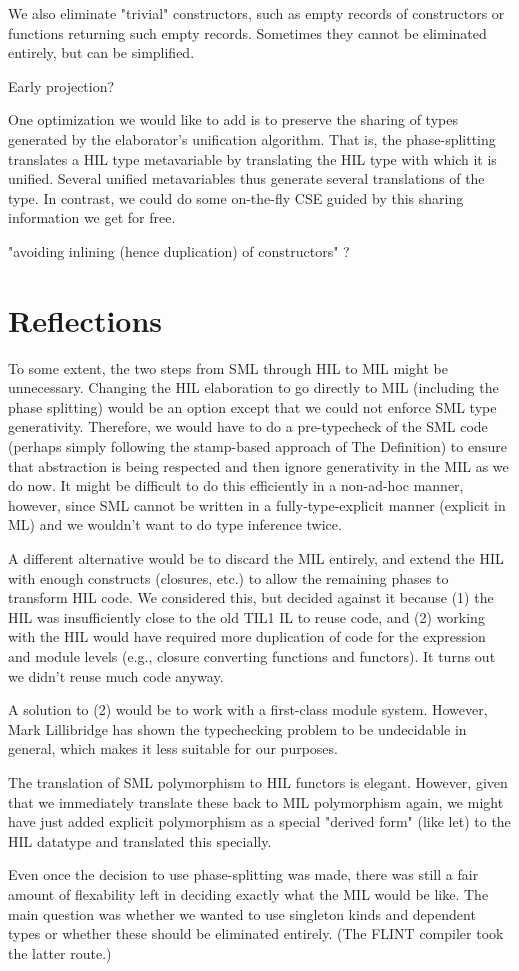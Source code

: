 \documentclass[12pt,twoside]{article}
\begin{document}
We also eliminate "trivial" constructors, such as empty records of
constructors or functions returning such empty records.  Sometimes
they cannot be eliminated entirely, but can be simplified.  

Early projection?

One optimization we would like to add is to preserve the
sharing of types generated by the elaborator's unification
algorithm.  That is, the phase-splitting translates a 
HIL type metavariable by translating the HIL type
with which it is unified.  Several unified
metavariables thus generate several translations of the type.
In contrast, we could do some on-the-fly CSE guided by
this sharing information we get for free.

"avoiding inlining (hence duplication) of constructors" ?

\section{Reflections}

To some extent, the two steps from SML through HIL to MIL might be
unnecessary.  Changing the HIL elaboration to go directly to MIL
(including the phase splitting) would be an option except that we
could not enforce SML type generativity.  Therefore, we would have to
do a pre-typecheck of the SML code (perhaps simply following the
stamp-based approach of The Definition) to ensure that abstraction is
being respected and then ignore generativity in the MIL as we do now.
It might be difficult to do this efficiently in a non-ad-hoc
manner, however, since SML cannot be written in a fully-type-explicit
manner (explicit in ML) and we wouldn't want to do type inference twice.

A different alternative would be to discard the MIL entirely, and
extend the HIL with enough constructs (closures, etc.) to allow the
remaining phases to transform HIL code.  We considered this, but
decided against it because (1) the HIL was insufficiently close to the
old TIL1 IL to reuse code, and (2) working with the HIL would have
required more duplication of code for the expression and module levels
(e.g., closure converting functions and functors).  It turns out 
we didn't reuse much code anyway.

A solution to (2) would be to work with a first-class module
system.  However, Mark Lillibridge has shown the typechecking
problem to be undecidable in general, which makes it less suitable
for our purposes.

The translation of SML polymorphism to HIL functors is elegant.
However, given that we immediately translate these back to MIL
polymorphism again, we might have just added explicit polymorphism as
a special "derived form" (like let) to the HIL datatype and translated
this specially.

Even once the decision to use phase-splitting was made, there
was still a fair amount of flexability left in deciding exactly
what the MIL would be like.  The main question was whether
we wanted to use singleton kinds and dependent types or
whether these should be eliminated entirely. (The FLINT compiler
took the latter route.)  
\end{document}
